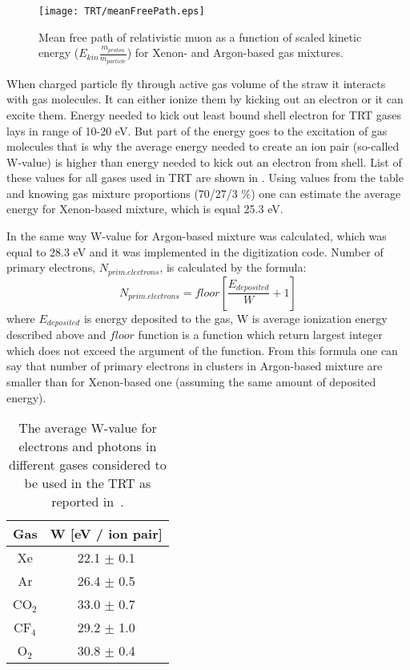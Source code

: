 \begin{figure}
\centering
 \texttt{[image: TRT/meanFreePath.eps]}
\caption{Mean free path of relativistic muon as a function of scaled kinetic energy ($E_{kin}\frac{m_{proton}}{m_{particle}}$) for Xenon- and Argon-based gas mixtures.}
\label{fig:meanFreePath}
\end{figure}

When charged particle fly through active gas volume of the straw it interacts with gas molecules.
It can either ionize them by kicking out an electron or it can excite them. Energy needed to kick out least bound shell electron for TRT gases lays
in range of 10-20 eV. But part of the energy goes to the excitation of gas molecules that is why the average energy needed to create an ion pair (so-called W-value) is higher than energy needed to 
kick out an electron from shell. List of these values for all gases used in TRT are shown in .
Using values from the table and knowing gas mixture proportions (70/27/3 $\%$) one can estimate the average energy for Xenon-based mixture, which is equal 25.3 eV.

In the same way W-value for Argon-based mixture was calculated, which was equal to 28.3 eV and it was implemented in the digitization code.
Number of primary electrons, $N_{prim.electrons}$, is calculated by the formula:
\begin{equation}
 N_{prim.electrons} = floor \left[\dfrac{E_{deposited}}{W} + 1\right]
\end{equation}
where $E_{deposited}$ is energy deposited to the gas, W is average ionization energy described above and $floor$ function is a function which return
largest integer which does not exceed the argument of the function.
From this formula one can say that number of primary electrons in clusters in Argon-based mixture are smaller than for Xenon-based one 
(assuming the same amount of deposited energy).

\begin{table}[p]
  \begin{tabular}{c|c}
    Gas & W [eV / ion pair]\\
    \hline
    Xe & 22.1 $\pm$ 0.1 \\
    Ar & 26.4 $\pm$ 0.5 \\
    CO$_2$ & 33.0 $\pm$ 0.7 \\
    CF$_4$ & 29.2 $\pm$ 1.0 \\
    O$_2$ & 30.8 $\pm$ 0.4 \\
  \end{tabular}
  \caption{The average W-value for electrons and photons in different gases considered to be used in the TRT as reported in~\cite{cwetanski_thesis}.}
  \label{tab:ionization_energy}
\end{table}

